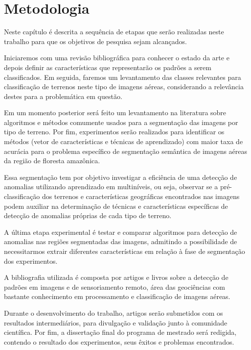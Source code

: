 \chapter{Metodologia}\label{cap:metodologia}

Neste capítulo é descrita a sequência de etapas que serão realizadas neste trabalho para que os objetivos de pesquisa sejam alcançados. 

Iniciaremos com uma revisão bibliográfica para conhecer o estado da arte e depois definir as características que representarão os padrões a serem classificados. Em seguida, faremos um levantamento das classes relevantes para classificação de terrenos neste tipo de imagens aéreas, considerando a relevância destes para a problemática em questão.

Em um momento posterior será feito um levantamento na literatura sobre algoritmos e métodos comumente usados para a segmentação das imagens por tipo de terreno. Por fim, experimentos serão realizados para identificar os métodos (vetor de características e técnicas de aprendizado) com maior taxa de acurácia para o problema específico de segmentação semântica de imagens aéreas da região de floresta amazônica.

Essa segmentação tem por objetivo investigar a eficiência de uma detecção de anomalias utilizando aprendizado em multiníveis, ou seja, observar se a pré-classificação dos terrenos e características geográficas encontrados nas imagens podem auxiliar na determinação de técnicas e características específicas de detecção de anomalias próprias de cada tipo de terreno.

A última etapa experimental é testar e comparar algoritmos para detecção de anomalias nas regiões segmentadas das imagens, admitindo a possibilidade de necessitarmos extrair diferentes características em relação à fase de segmentação dos experimentos.

A bibliografia utilizada é composta por artigos e livros sobre a detecção de padrões em imagens e de sensoriamento remoto, área das geociências com bastante conhecimento em processamento e classificação de imagens aéreas.

Durante o desenvolvimento do trabalho, artigos serão submetidos com os resultados intermediários, para divulgação e validação junto à comunidade científica. Por fim, a dissertação final do programa de mestrado será redigida, contendo o resultado dos experimentos, seus êxitos e problemas encontrados.